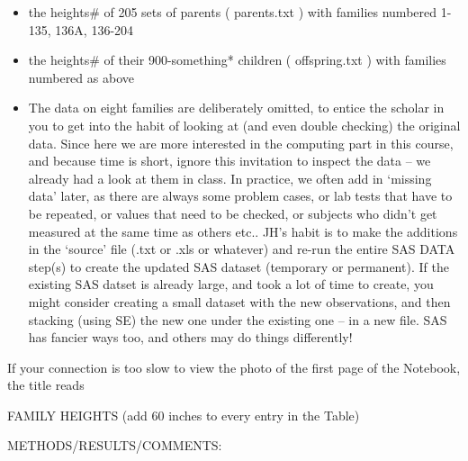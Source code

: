 \documentclass[]{book}
\begin{document}
\begin{itemize}
\item
  the heights\# of 205 sets of parents ( parents.txt ) with families numbered 1-135, 136A, 136-204
\item
  the heights\# of their 900-something* children ( offspring.txt ) with families numbered as above
\item
  The data on eight families are deliberately omitted, to entice the scholar in you to get into the habit of looking at (and even double checking) the original data. Since here we are more interested in the computing part in this course, and because time is short, ignore this invitation to inspect the data -- we already had a look at them in class. In practice, we often add in `missing data' later, as there are always some problem cases, or lab tests that have to be repeated, or values that need to be checked, or subjects who didn't get measured at the same time as others etc.. JH's habit is to make the additions in the `source' file (.txt or .xls or whatever) and re-run the entire SAS DATA step(s) to create the updated SAS dataset (temporary or permanent). If the existing SAS datset is already large, and took a lot of time to create, you might consider creating a small dataset with the new observations, and then stacking (using SE) the new one under the existing one -- in a new file. SAS has fancier ways too, and others may do things differently!
\end{itemize}

If your connection is too slow to view the photo of the first page of the Notebook, the title reads

FAMILY HEIGHTS
(add 60 inches to every entry in the Table)

METHODS/RESULTS/COMMENTS:
\end{document}
